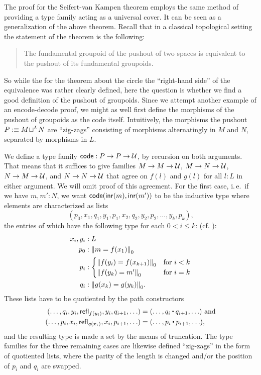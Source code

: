The proof for the Seifert-van Kampen theorem employs the same method of
providing a type family acting as a universal cover.
It can be seen as a generalization of the above theorem.
Recall that in a classical topological setting the statement of the
theorem is the following:
\begin{quote}
The fundamental groupoid of the pushout of two spaces is equivalent to the pushout of
its fundamental groupoids.
\end{quote}
So while the for the theorem about the circle the ``right-hand side'' of the
equivalence was rather clearly defined, here the
question is whether we find a good definition of the pushout of groupoids.
Since we attempt another example of an encode-decode proof, we
might as well first define the morphisms of the pushout of groupoids as the
code itself.
Intuitively, the morphisms the pushout $P :\equiv \pout{L}{M}{N}$
are ``zig-zags'' consisting of morphisms
alternatingly in ${M}$ and ${N}$, separated by morphisms in $L$.
\begin{defn}
We define a type family $\code : P \to P \to \UU$, by recursion on both arguments.
That means that it suffices to give families $M \to M \to \UU$,
$M \to N \to \UU$, $N \to M \to \UU$, and $N \to N \to \UU$ that agree on
$f(l)$ and $g(l)$ for all $l : L$ in either argument.
We will omit proof of this agreement.
For the first case, i.\,e.\ if we have $m, m' : N$, we want $\code(\inr(m), \inr(m'))$ to be
the inductive type where elements are characterized as lists
\begin{equation*}
 (p_0, x_1, q_1, y_1, p_1, x_2, q_2, y_2, p_2, \ldots, y_k, p_k) \text{,}
\end{equation*}
the entries of which have the following type for each $0 < i \leq k$: (cf. ):
\begin{align*}
x_i, y_i &: L \\
p_0 &: \trunc{0}{m = f(x_1)} \\
p_i &: \begin{cases} \trunc{0}{f(y_i) = f(x_{k + 1})} & \text{for $i < k$} \\
  \trunc{0}{f(y_k) = m'} & \text{for $i = k$}  \end{cases} \\
q_i &: \trunc{0}{g(x_k) = g(y_k)} \text{.}
\end{align*}
These lists have to be quotiented by the path constructors
\begin{align*}
(\ldots, q_i, y_i, \refl_{f(y_i)}, y_i, q_{i+1}, \ldots)
  &= (\ldots, q_i \ct q_{i+1}, \ldots) \text{ and} \\
(\ldots, p_i, x_i, \refl_{g(x_i)}, x_i, p_{i+1}, \ldots)
  &= (\ldots, p_i \ct p_{i+1}, \ldots) \text{,}
\end{align*}
and the resulting type is made a set by the means of truncation.
The type families for the three remaining cases are likewise defined
``zig-zags'' in the form of quotiented lists, where the parity of the length
is changed and/or the position of $p_i$ and $q_i$ are swapped.
\end{defn}

